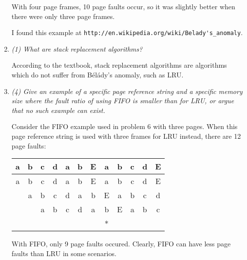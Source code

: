 \documentclass[letterpaper,11pt]{article}
\begin{document}
\begin{enumerate}
With four page frames, 10 page faults occur, so it was slightly better when there were only three page frames.

I found this example at \verb+http://en.wikipedia.org/wiki/Belady's_anomaly+.
\item  \emph{(1) What are stack replacement algorithms?}

According to the textbook, stack replacement algorithms are algorithms which do not suffer from B\'{e}l\'{a}dy's anomaly, such as LRU.
\item  \emph{(4) Give an example of a specific page reference string and a specific memory size where the
fault ratio of using FIFO is smaller than for LRU, or argue that no such example can exist.}

Consider the FIFO example used in problem 6 with three pages.  When this page reference string is used with three frames for LRU instead, there are 12 page faults:
\begin{center}
  \begin{tabular}{ | c | c | c | c | c | c | c | c | c | c | c | c | }
  \hline
                     a & b & c & d & a & b & E & a & b & c & d & E \\ \hline 
                     a & b & c & d & a & b & E & a & b & c & d & E \\
                       & a & b & c & d & a & b & E & a & b & c & d \\
                       &   & a & b & c & d & a & b & E & a & b & c \\ \hline
                       &   &   &   &   &   &   & * &   &   &   &   \\ \hline
  \end{tabular}
\end{center}

With FIFO, only 9 page faults occured.  Clearly, FIFO can have less page faults than LRU in some scenarios.
\end{enumerate}
\end{document}
